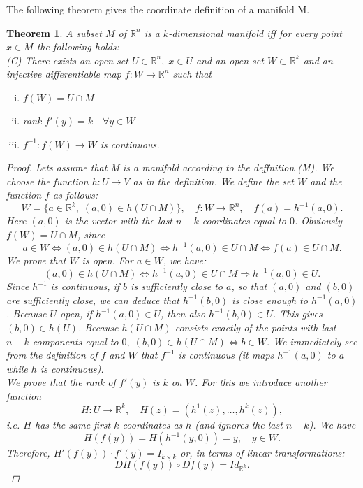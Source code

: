 \documentclass[12pt]{article}
\def\RR{\mathbb{R}}
\newtheorem{theorem}{Theorem}[section]
\begin{document}
The following theorem gives the coordinate definition of a manifold M.

\begin{theorem}
A subset $M$ of $\RR^n$ is a $k$-dimensional manifold iff for every point $x \in M$ the following holds:\\
(C) There exists an open set $U \in \RR^n,\; x \in U$ and an open set $W \subset \RR^k$ and an injective
differentiable map $f : W \rightarrow \RR^n$ such that
\begin{enumerate}[(i)]
\item $f(W) = U \cap M$
\item rank $f'(y) = k \quad \forall y \in W$
\item $f^{-1} : f(W) \rightarrow W$ is continuous.
\end{enumerate}
\begin{proof}
 Lets assume that M is a manifold according to the deffnition (M). We choose the function $h : U \rightarrow V$ as in the definition. We define the set $W$ and the function $f$ as follows:
\[W = \{a \in \RR^k, \; (a, 0) \in h(U \cap M) \}, \quad f : W \rightarrow \RR^n, \quad  f(a) = h^{-1}(a, 0).\]
Here $(a, 0)$ is the vector with the last $n-k$ coordinates equal to $0$. Obviously $f(W) = U\cap M$, since
\[a \in W \Leftrightarrow (a, 0) \in h(U \cap M) \Leftrightarrow h^{-1}(a, 0) \in U \cap M \Leftrightarrow f(a) \in U \cap M.\]
We prove that $W$ is open. For $a \in W$, we have:
\[(a, 0) \in h(U \cap M) \Leftrightarrow h^{-1}(a, 0) \in U \cap M \Rightarrow h^{-1}(a, 0) \in U.\]
Since $h^{-1}$ is continuous, if $b$ is sufficiently close to $a$, so that $(a, 0)$ and $(b, 0)$ are sufficiently close, we can deduce that $h^{-1}(b, 0)$ is close enough to $h^{-1}(a, 0)$. Because $U$ open, if $h^{-1}(a, 0) \in U$, then also $h^{-1}(b, 0) \in U$. This gives $(b, 0) \in h(U)$. Because $h(U \cap M)$ consists exactly of the points with last $n- k$ components equal to $0, \; (b, 0) \in h(U\cap M) \Leftrightarrow b \in W$. We immediately see from the definition of $f$ and $W$ that $f^{-1}$ is continuous (it maps $h^{-1}(a, 0)$ to $a$ while $h$ is continuous).\\
We prove that the rank of $f'(y)$ is $k$ on $W$. For this we introduce another function
\[H : U \rightarrow \RR^k, \quad  H(z) = (h^1(z),\dots , h^k(z)),\]
i.e. $H$ has the same first $k$ coordinates as $h$ (and ignores the last $n - k$). We have
\[H(f(y)) = H(h^{-1}(y, 0)) = y, \quad  y \in W.\]
Therefore, $H'(f(y) )\cdot f'(y) = I_{k\times k}$ or, in terms of linear transformations:
\[DH(f(y)) \circ Df(y) = Id_{\RR^k}.\]

\end{proof}
\end{theorem}
\end{document}
